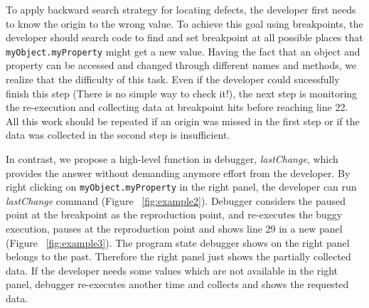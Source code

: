 \documentclass[preprint]{sigplanconf}
\begin{document}
To apply backward search strategy for locating defects, the developer
first needs to know the origin to the wrong value. To achieve this
goal using breakpoints, the developer should search code to find and
set breakpoint at all possible places that
\texttt{myObject.myProperty} might get a new value. Having the fact
that an object and property can be accessed and changed through
different names and methods, we realize that the difficulty of this
task. Even if the developer could sucessfully finish this step (There
is no simple way to check it!), the next step is monitoring the
re-execution and collecting data at breakpoint hits before reaching
line 22. All this work should be repeated if an origin was missed in
the first step or if the data was collected in the second step is
insufficient.

In contrast, we propose a high-level function in debugger,
\textit{lastChange}, which provides the answer without demanding
anymore effort from the developer. By right clicking on
\texttt{myObject.myProperty} in the right panel, the developer can run
\textit{lastChange} command (Figure ~\ref{fig:example2}). Debugger
considers the paused point at the breakpoint as the reproduction
point, and re-executes the buggy execution, pauses at the reproduction
point and shows line 29 in a new panel (Figure
~\ref{fig:example3}). The program state debugger shows on the right
panel belongs to the past. Therefore the right panel just shows the
partially collected data. If the developer needs some values which are
not available in the right panel, debugger re-executes another time
and collects and shows the requested data.
\end{document}
